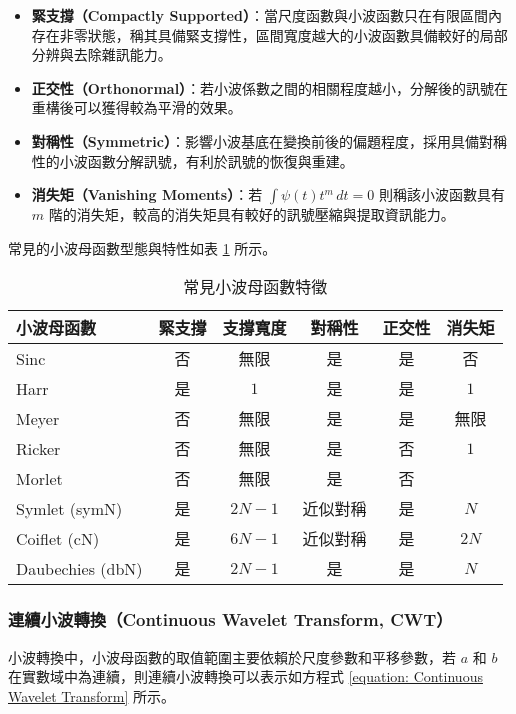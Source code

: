 \begin{itemize}
  \item \textbf{緊支撐（Compactly Supported）}：當尺度函數與小波函數只在有限區間內存在非零狀態，稱其具備緊支撐性，區間寬度越大的小波函數具備較好的局部分辨與去除雜訊能力。
  \item \textbf{正交性（Orthonormal）}：若小波係數之間的相關程度越小，分解後的訊號在重構後可以獲得較為平滑的效果。
  \item \textbf{對稱性（Symmetric）}：影響小波基底在變換前後的偏題程度，採用具備對稱性的小波函數分解訊號，有利於訊號的恢復與重建。
  \item \textbf{消失矩（Vanishing Moments）}：若 $\displaystyle \int \psi(t) t^m \, dt = 0$ 則稱該小波函數具有 $m$ 階的消失矩，較高的消失矩具有較好的訊號壓縮與提取資訊能力。
\end{itemize}

常見的小波母函數型態與特性如表 \ref{table: Wavelet Mother Function} 所示。

\begin{table}[htp]
  \centering
  \caption[常見小波母函數特徵]{常見小波母函數特徵}
  \begin{tabular*}{0.85\textwidth}{lccccc}
    \toprule
    \textbf{小波母函數} & \textbf{緊支撐} & \textbf{支撐寬度} & \textbf{對稱性} & \textbf{正交性} & \textbf{消失矩} \\
    \midrule
    Sinc & 否 & 無限 & 是 & 是 & 否 \\
    Harr & 是 & $1$ & 是 & 是 & $1$ \\
    Meyer & 否 & 無限 & 是 & 是 & 無限 \\
    Ricker & 否 & 無限 & 是 & 否 & $1$ \\
    Morlet & 否 & 無限 & 是 & 否 & \\
    Symlet (symN) & 是 & $2N-1$ & 近似對稱 & 是 & $N$ \\
    Coiflet (cN) & 是 & $6N-1$ & 近似對稱 & 是 & $2N$ \\
    Daubechies (dbN) & 是 & $2N-1$ & 是 & 是 & $N$ \\
    \bottomrule
  \end{tabular*}
  \label{table: Wavelet Mother Function}
\end{table}

\subsubsection{連續小波轉換（Continuous Wavelet Transform, CWT）}

小波轉換中，小波母函數的取值範圍主要依賴於尺度參數和平移參數，若 $a$ 和 $b$ 在實數域中為連續，則連續小波轉換可以表示如方程式 \eqref{equation: Continuous Wavelet Transform} 所示。


